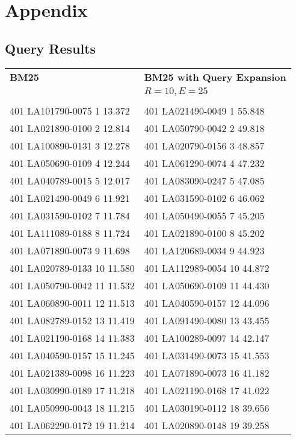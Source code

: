 
\appendix
\section{Appendix}
\setlength{\tabcolsep}{15pt}

\subsection{Query Results}
\label{query_results}

\begin{tabular}{ l l }
\textbf{BM25} & \textbf{BM25 with Query Expansion}\\
              & $R = 10, E = 25$\\\\
401 LA101790-0075 1 13.372 & 401 LA021490-0049 1 55.848\\
401 LA021890-0100 2 12.814 & 401 LA050790-0042 2 49.818\\
401 LA100890-0131 3 12.278 & 401 LA020790-0156 3 48.857\\
401 LA050690-0109 4 12.244 & 401 LA061290-0074 4 47.232\\
401 LA040789-0015 5 12.017 & 401 LA083090-0247 5 47.085\\
401 LA021490-0049 6 11.921 & 401 LA031590-0102 6 46.062\\
401 LA031590-0102 7 11.784 & 401 LA050490-0055 7 45.205\\
401 LA111089-0188 8 11.724 & 401 LA021890-0100 8 45.202\\
401 LA071890-0073 9 11.698 & 401 LA120689-0034 9 44.923\\
401 LA020789-0133 10 11.580 & 401 LA112989-0054 10 44.872\\
401 LA050790-0042 11 11.532 & 401 LA050690-0109 11 44.430\\
401 LA060890-0011 12 11.513 & 401 LA040590-0157 12 44.096\\
401 LA082789-0152 13 11.419 & 401 LA091490-0080 13 43.455\\
401 LA021190-0168 14 11.383 & 401 LA100289-0097 14 42.147\\
401 LA040590-0157 15 11.245 & 401 LA031490-0073 15 41.553\\
401 LA021389-0098 16 11.223 & 401 LA071890-0073 16 41.182\\
401 LA030990-0189 17 11.218 & 401 LA021190-0168 17 41.022\\
401 LA050990-0043 18 11.215 & 401 LA030190-0112 18 39.656\\
401 LA062290-0172 19 11.214 & 401 LA020890-0148 19 39.258\\

\end{tabular}

